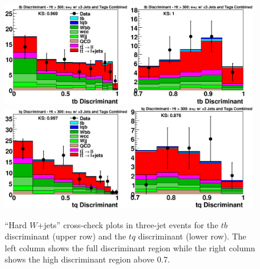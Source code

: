 \clearpage
\begin{figure}[!h!tbp]
\includegraphics[width=0.49\textwidth]
{eps/MatrixElement/cross_check/combined/3jet/TTbar_tb_Discriminant}
\includegraphics[width=0.49\textwidth]
{eps/MatrixElement/cross_check/combined/3jet/TTbar_tb_Discriminant_Zoom}
\includegraphics[width=0.49\textwidth]
{eps/MatrixElement/cross_check/combined/3jet/TTbar_tq_Discriminant}
\includegraphics[width=0.49\textwidth]
{eps/MatrixElement/cross_check/combined/3jet/TTbar_tq_Discriminant_Zoom}
\vspace{-0.1in}
\caption{``Hard $W$+jets'' cross-check plots in three-jet
events for the $tb$ discriminant (upper row) and the $tq$ discriminant
(lower row). The left column shows the full discriminant region while
the right column shows the high discriminant region above 0.7.}
\label{ttbar-cross-3jet}
\end{figure}

